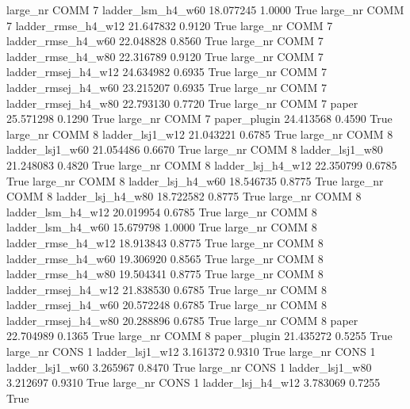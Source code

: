   large_nr     COMM                 7   ladder_lsm_h4_w60   18.077245      1.0000    True
  large_nr     COMM                 7  ladder_rmse_h4_w12   21.647832      0.9120    True
  large_nr     COMM                 7  ladder_rmse_h4_w60   22.048828      0.8560    True
  large_nr     COMM                 7  ladder_rmse_h4_w80   22.316789      0.9120    True
  large_nr     COMM                 7 ladder_rmsej_h4_w12   24.634982      0.6935    True
  large_nr     COMM                 7 ladder_rmsej_h4_w60   23.215207      0.6935    True
  large_nr     COMM                 7 ladder_rmsej_h4_w80   22.793130      0.7720    True
  large_nr     COMM                 7               paper   25.571298      0.1290    True
  large_nr     COMM                 7        paper_plugin   24.413568      0.4590    True
  large_nr     COMM                 8     ladder_lsj1_w12   21.043221      0.6785    True
  large_nr     COMM                 8     ladder_lsj1_w60   21.054486      0.6670    True
  large_nr     COMM                 8     ladder_lsj1_w80   21.248083      0.4820    True
  large_nr     COMM                 8   ladder_lsj_h4_w12   22.350799      0.6785    True
  large_nr     COMM                 8   ladder_lsj_h4_w60   18.546735      0.8775    True
  large_nr     COMM                 8   ladder_lsj_h4_w80   18.722582      0.8775    True
  large_nr     COMM                 8   ladder_lsm_h4_w12   20.019954      0.6785    True
  large_nr     COMM                 8   ladder_lsm_h4_w60   15.679798      1.0000    True
  large_nr     COMM                 8  ladder_rmse_h4_w12   18.913843      0.8775    True
  large_nr     COMM                 8  ladder_rmse_h4_w60   19.306920      0.8565    True
  large_nr     COMM                 8  ladder_rmse_h4_w80   19.504341      0.8775    True
  large_nr     COMM                 8 ladder_rmsej_h4_w12   21.838530      0.6785    True
  large_nr     COMM                 8 ladder_rmsej_h4_w60   20.572248      0.6785    True
  large_nr     COMM                 8 ladder_rmsej_h4_w80   20.288896      0.6785    True
  large_nr     COMM                 8               paper   22.704989      0.1365    True
  large_nr     COMM                 8        paper_plugin   21.435272      0.5255    True
  large_nr     CONS                 1     ladder_lsj1_w12    3.161372      0.9310    True
  large_nr     CONS                 1     ladder_lsj1_w60    3.265967      0.8470    True
  large_nr     CONS                 1     ladder_lsj1_w80    3.212697      0.9310    True
  large_nr     CONS                 1   ladder_lsj_h4_w12    3.783069      0.7255    True
